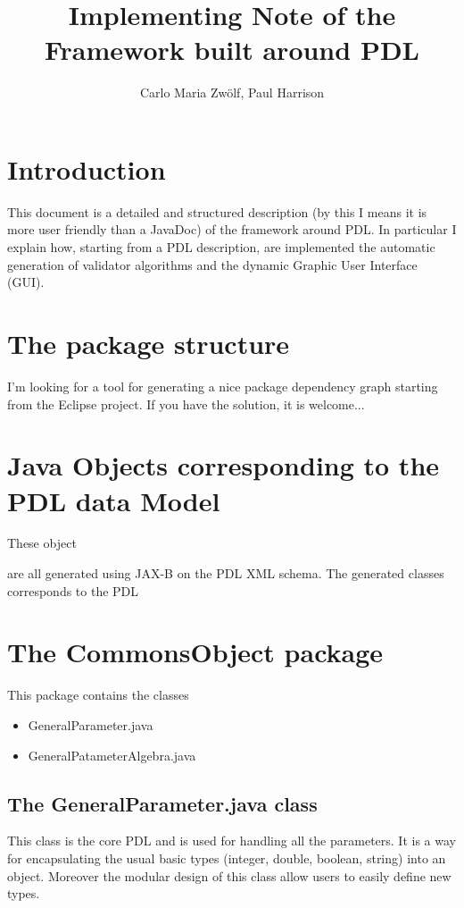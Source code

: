 \documentclass[a4paper,11pt] {ivoa}
\title{Implementing Note of the Framework built around PDL}
\author{Carlo Maria Zw\"olf, Paul Harrison}
\date{\pdldate}
\begin{document}
\maketitle

\newpage

\tableofcontents

\newpage

\section{Introduction}\label{intro}
This document is a detailed and structured description (by this I means it is more user friendly than a JavaDoc) of the framework around PDL. In particular I explain how, starting from a PDL description, are implemented the automatic generation of validator algorithms and the dynamic Graphic User Interface (GUI). 

\section{The package structure}
I'm looking for a tool for generating a nice package dependency graph starting from the Eclipse project. If you have the solution, it is welcome...

\section{Java Objects corresponding to the PDL data Model}\label{Java_Objects}
These object 


are all generated using JAX-B on the PDL XML schema. The generated classes corresponds to the PDL 


\section{The CommonsObject package}\label{commons}
This package contains the classes 
\begin{itemize}
\item GeneralParameter.java
\item GeneralPatameterAlgebra.java
\end{itemize}

\subsection{The  GeneralParameter.java class }\label{generalParameter}
This class is the core PDL and is used for handling all the parameters. It is a way for encapsulating the usual basic types (integer, double, boolean, string) into an object. Moreover the modular design of this class allow users to easily define new types.\\
\end{document}
